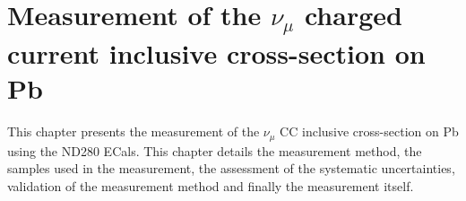 


\chapter{Measurement of the $\nu_\mu$ charged current inclusive cross-section on Pb}
\label{chap:CrossSectionMeasurement}
This chapter presents the measurement of the $\nu_\mu$ CC inclusive cross-section on Pb using the ND280 ECals.  This chapter details the measurement method, the samples used in the measurement, the assessment of the systematic uncertainties, validation of the measurement method and finally the measurement itself.

